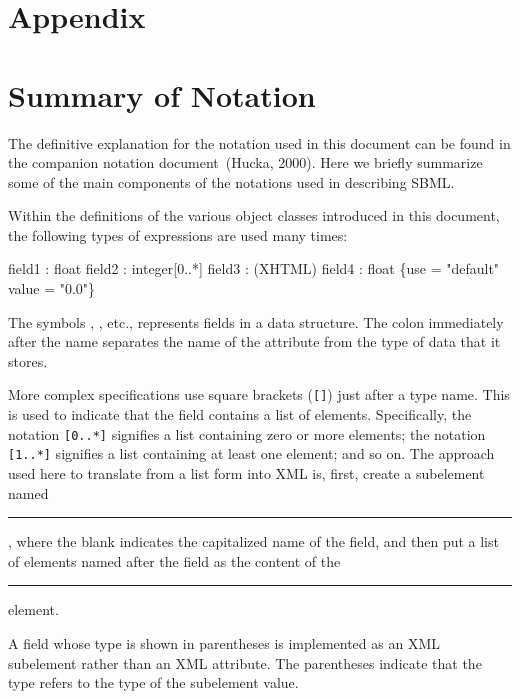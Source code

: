 \documentclass[10pt]{cekarticle}
\begin{document}

\newpage
\section{Appendix}
\setcounter{secnumdepth}{2}
\appendix
\section{Summary of Notation}
\label{apdx:notation}

The definitive explanation for the notation used in this document can be
found in the companion notation document~(Hucka, 2000).  Here we briefly
summarize some of the main components of the notations used in describing
SBML.

Within the definitions of the various object classes introduced in this
document, the following types of expressions are used many times:

\begin{example}
  field1 : float
  field2 : integer[0..*]
  field3 : (XHTML)
  field4 : float \{use = "default" value = "0.0"\}
\end{example}

The symbols , , etc., represents fields in a
data structure.  The colon immediately after the name separates the name of
the attribute from the type of data that it stores.

More complex specifications use square brackets (\texttt{[]}) just after a
type name.  This is used to indicate that the field contains a list of
elements.  Specifically, the notation \texttt{[0..*]} signifies a list
containing zero or more elements; the notation \texttt{[1..*]} signifies a
list containing at least one element; and so on.  The approach used here to
translate from a list form into XML is, first, create a subelement named
\rule{0.5in}{0.5pt}, where the blank indicates the
capitalized name of the field, and then put a list of elements named after
the field as the content of the \rule{0.5in}{0.5pt}
element.

A field whose type is shown in parentheses is implemented as an
XML subelement rather than an XML attribute.  The parentheses
indicate that the type refers to the type of the subelement value.
\end{document}
